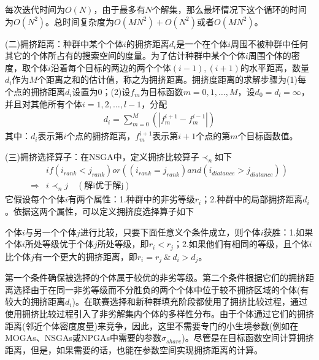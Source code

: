             \par
            每次迭代时间为$O(N)$，由于最多有$N$个解集，那么最坏情况下这个循环的时间为$O(N^2)$。总时间复杂度为$O(MN^2)+O(N^2)$或者$O(MN^2)$。
            \par
            (二)拥挤距离：种群中某个个体$i$的拥挤距离$d_i$是一个在个体$i$周围不被种群中任何其它的个体所占有的搜索空间的度量。为了估计种群中某个个体$i$周围个体的密度，取个体$i$沿着每个目标的两边的两个个体$(i-1),(i+1)$的水平距离，数量$d_i$作为$M$个距离之和的估计值，称之为拥挤距离。拥挤度距离的求解步骤为(1)每个点的拥挤距离$d_i$设置为0；(2)设$f_m$为目标函数$m=0,1,\dots,M$，设$d_0 = d_l =\infty $，并且对其他所有个体$i = 1,2,\dots,l-1$，分配
            \begin{align*}
            d_i = \sum_{m=0}^M \left( |f_m^{i+1} - f_m^{i-1}| \right)
            \end{align*}
            其中：$d_i$表示第$i$个点的拥挤距离，$f_m^{i+1}$表示第$i+1$个点的第$m$个目标函数值。
            \par
            (三)拥挤选择算子：在NSGA中，定义拥挤比较算子$\prec_n$如下
            \begin{align*}
            & if(i_{rank}<j_{rank})or((i_{rank} = j_{rank})and(i_{diatance}>j_{diatance}))\\
             \Rightarrow {} & i\prec_n j\quad (\text{解i优于解j})
            \end{align*}
            它假设每个个体$i$有两个属性：1.种群中的非劣等级$r_i$；2.种群中的局部拥挤距离$d_i$。依据这两个属性，可以定义拥挤度选择算子如下
            \begin{definition}[拥挤选择算子]
            个体$i$与另一个个体$j$进行比较，只要下面任意义个条件成立，则个体$i$获胜：1.如果个体$i$所处等级优于个体$j$所处等级，即$r_i<r_j$；2.如果他们有相同的等级，且个体$i$比个体$j$有一个更大的拥挤距离，即$r_i=r_j\ \& \ d_i>d_j$。
            \end{definition}
            \par
            第一个条件确保被选择的个体属于较优的非劣等级。第二个条件根据它们的拥挤距离选择由于在同一非劣等级而不分胜负的两个个体中位于较不拥挤区域的个体(有较大的拥挤距离$d_i$)。在联赛选择和新种群填充阶段都使用了拥挤比较过程，通过使用拥挤比较过程引入了非劣解集内个体的多样性分布。由于个体通过它们的拥挤距离(邻近个体密度度量)来竞争，因此，这里不需要专门的小生境参数(例如在MOGAs、NSGAs或NPGAs中需要的参数$\sigma_{share}$)。尽管是在目标函数空间计算拥挤距离，但是，如果需要的话，也能在参数空间实现拥挤距离的计算。

